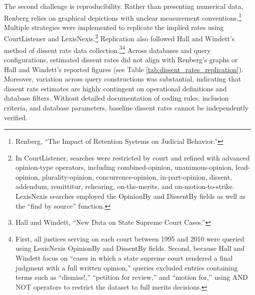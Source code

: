 The second challenge is reproducibility. Rather than presenting
numerical data, Renberg relies on graphical depictions with unclear
measurement conventions.\footnote{Renberg, {``The {Impact} of {Retention
  Systems} on {Judicial Behavior}.''}} Multiple strategies were
implemented to replicate the implied rates using CourtListener and
LexisNexis.\footnote{In CourtListener, searches were restricted by court
  and refined with advanced opinion-type operators, including
  combined-opinion, unanimous-opinion, lead-opinion, plurality-opinion,
  concurrence-opinion, in-part-opinion, dissent, addendum, remittitur,
  rehearing, on-the-merits, and on-motion-to-strike. LexisNexis searches
  employed the OpinionBy and DissentBy fields as well as the ``find by
  source'' function.} Replication also followed Hall and Windett's
method of dissent rate data collection.\footnote{Hall and Windett,
  {``New {Data} on {State Supreme Court Cases}.''}}\footnote{First, all
  justices serving on each court between 1995 and 2010 were queried
  using LexisNexis OpinionBy and DissentBy fields. Second, because Hall
  and Windett focus on ``cases in which a state supreme court rendered a
  final judgment with a full written opinion,'' queries excluded entries
  containing terms such as ``dismiss!,'' ``petition for review,'' and
  ``motion for,'' using AND NOT operators to restrict the dataset to
  full merits decisions.} Across databases and query configurations,
estimated dissent rates did not align with Renberg's graphs or Hall and
Windett's reported figures (see Table
\ref{tab:dissent_rates_replication}). Moreover, variation across query
constructions was substantial, indicating that dissent rate estimates
are highly contingent on operational definitions and database filters.
Without detailed documentation of coding rules, inclusion criteria, and
database parameters, baseline dissent rates cannot be independently
verified.

